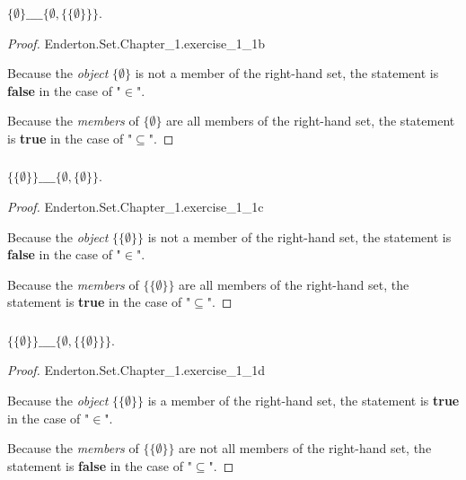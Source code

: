\documentclass{report}
\begin{document}
\subsubsection{}%

$\{\emptyset\} \_\_\_\_ \{\emptyset, \{\{\emptyset\}\}\}$.

\begin{proof}

    {Enderton.Set.Chapter\_1.exercise\_1\_1b}

  Because the \textit{object} $\{\emptyset\}$ is not a member of the right-hand
    set, the statement is \textbf{false} in the case of "$\in$".

  Because the \textit{members} of $\{\emptyset\}$ are all members of the
    right-hand set, the statement is \textbf{true} in the case of "$\subseteq$".

\end{proof}

\subsubsection{}%

$\{\{\emptyset\}\} \_\_\_\_ \{\emptyset, \{\emptyset\}\}$.

\begin{proof}

    {Enderton.Set.Chapter\_1.exercise\_1\_1c}

  Because the \textit{object} $\{\{\emptyset\}\}$ is not a member of the
    right-hand set, the statement is \textbf{false} in the case of "$\in$".

  Because the \textit{members} of $\{\{\emptyset\}\}$ are all members of the
    right-hand set, the statement is \textbf{true} in the case of "$\subseteq$".

\end{proof}

\subsubsection{}%

$\{\{\emptyset\}\} \_\_\_\_ \{\emptyset, \{\{\emptyset\}\}\}$.

\begin{proof}

    {Enderton.Set.Chapter\_1.exercise\_1\_1d}

  Because the \textit{object} $\{\{\emptyset\}\}$ is a member of the right-hand
    set, the statement is \textbf{true} in the case of "$\in$".

  Because the \textit{members} of $\{\{\emptyset\}\}$ are not all members of the
    right-hand set, the statement is \textbf{false} in the case of
    "$\subseteq$".

\end{proof}
\end{document}
